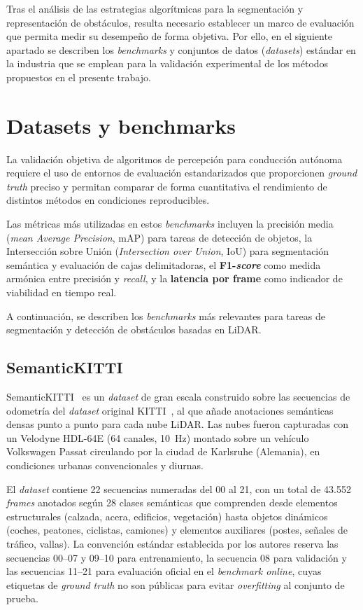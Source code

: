 Tras el análisis de las estrategias algorítmicas para la segmentación y
representación de obstáculos, resulta necesario establecer un marco de
evaluación que permita medir su desempeño de forma objetiva. Por ello,
en el siguiente apartado se describen los \textit{benchmarks} y
conjuntos de datos (\textit{datasets}) estándar en la industria que se
emplean para la validación experimental de los métodos propuestos en el
presente trabajo.

\section{Datasets y benchmarks}
\label{sec:datasets}

La validación objetiva de algoritmos de percepción para conducción
autónoma requiere el uso de entornos de evaluación estandarizados que
proporcionen \textit{ground truth} preciso y permitan comparar de forma
cuantitativa el rendimiento de distintos métodos en condiciones
reproducibles.

Las métricas más utilizadas en estos \textit{benchmarks} incluyen la
precisión media (\textit{mean Average Precision}, mAP) para tareas de
detección de objetos, la Intersección sobre Unión (\textit{Intersection
over Union}, IoU) para segmentación semántica y evaluación de cajas
delimitadoras, el \textbf{F1-\textit{score}} como medida armónica entre
precisión y \textit{recall}, y la \textbf{latencia por frame} como
indicador de viabilidad en tiempo real.

A continuación, se describen los \textit{benchmarks} más relevantes
para tareas de segmentación y detección de obstáculos basadas en LiDAR.

\subsection{SemanticKITTI}
\label{sec:semantickitti}

SemanticKITTI~\cite{behley2019semantickitti} es un \textit{dataset} de
gran escala construido sobre las secuencias de odometría del
\textit{dataset} original KITTI~\cite{geiger2012kitti}, al que añade
anotaciones semánticas densas punto a punto para cada nube LiDAR. Las
nubes fueron capturadas con un Velodyne HDL-64E (64 canales, 10~Hz)
montado sobre un vehículo Volkswagen Passat circulando por la ciudad de
Karlsruhe (Alemania), en condiciones urbanas convencionales y diurnas.

El \textit{dataset} contiene 22 secuencias numeradas del 00 al 21, con
un total de 43.552 \textit{frames} anotados según 28 clases semánticas
que comprenden desde elementos estructurales (calzada, acera,
edificios, vegetación) hasta objetos dinámicos (coches, peatones,
ciclistas, camiones) y elementos auxiliares (postes, señales de
tráfico, vallas). La convención estándar establecida por los autores
reserva las secuencias 00--07 y 09--10 para entrenamiento, la secuencia
08 para validación y las secuencias 11--21 para evaluación oficial en
el \textit{benchmark online}, cuyas etiquetas de \textit{ground truth}
no son públicas para evitar \textit{overfitting} al conjunto de prueba.

